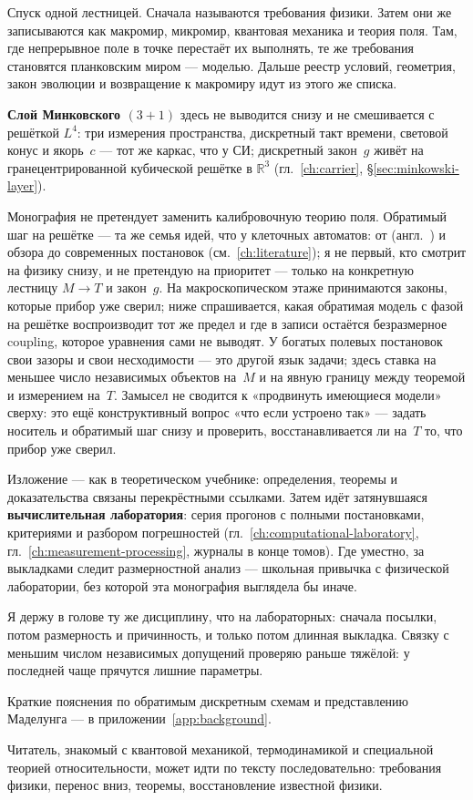 Спуск одной лестницей.
Сначала называются требования физики.
Затем они же записываются как макромир, микромир, квантовая механика и теория поля.
Там, где непрерывное поле в точке перестаёт их выполнять, те же требования становятся планковским миром --- моделью.
Дальше реестр условий, геометрия, закон эволюции и возвращение к макромиру идут из этого же списка.

\medskip
\noindent
\textbf{Слой Минковского $(3{+}1)$} здесь не выводится снизу и не смешивается с решёткой $L^4$:
три измерения пространства, дискретный такт времени, световой конус и якорь~$c$ --- тот же каркас, что у СИ;
дискретный закон~$g$ живёт на гранецентрированной кубической решётке в $\mathbb{R}^3$
(гл.~\ref{ch:carrier}, \S\ref{sec:minkowski-layer}).

\medskip
\noindent
Монография не претендует заменить калибровочную теорию поля.
Обратимый шаг на решётке --- та же семья идей, что у клеточных автоматов: от \textcite{zuse1969}
(англ.\ \textcite{zuse2012zenil}) и обзора \textcite{bandman2006} до современных постановок (см.\ \cref{ch:literature});
я не первый, кто смотрит на физику снизу, и не претендую на приоритет --- только на конкретную лестницу $M\to T$ и закон~$g$.
На макроскопическом этаже принимаются законы, которые прибор уже сверил; ниже спрашивается, какая обратимая модель с фазой на решётке воспроизводит тот же предел
и где в записи остаётся безразмерное coupling, которое уравнения сами не выводят.
У богатых полевых постановок свои зазоры и свои несходимости --- это другой язык задачи;
здесь ставка на меньшее число независимых объектов на~$M$ и на явную границу между теоремой и измерением на~$T$.
Замысел не сводится к «продвинуть имеющиеся модели» сверху: это ещё конструктивный вопрос «что если устроено так» ---
задать носитель и обратимый шаг снизу и проверить, восстанавливается ли на~$T$ то, что прибор уже сверил.

Изложение --- как в теоретическом учебнике: определения, теоремы и доказательства
связаны перекрёстными ссылками.
Затем идёт затянувшаяся \textbf{вычислительная лаборатория}: серия прогонов с полными постановками,
критериями и разбором погрешностей (гл.~\ref{ch:computational-laboratory}, гл.~\ref{ch:measurement-processing},
журналы в конце томов).
Где уместно, за выкладками следит размерностной анализ --- школьная привычка
с физической лаборатории, без которой эта монография выглядела бы иначе.

\medskip
\noindent
Я держу в голове ту же дисциплину, что на лабораторных: сначала посылки,
потом размерность и причинность, и только потом длинная выкладка.
Связку с меньшим числом независимых допущений проверяю раньше тяжёлой:
у последней чаще прячутся лишние параметры.

Краткие пояснения по обратимым дискретным схемам и представлению Маделунга ---
в приложении~\ref{app:background}.

Читатель, знакомый с квантовой механикой, термодинамикой и специальной теорией относительности,
может идти по тексту последовательно: требования физики, перенос вниз, теоремы, восстановление известной физики.

\cleardoublepage

